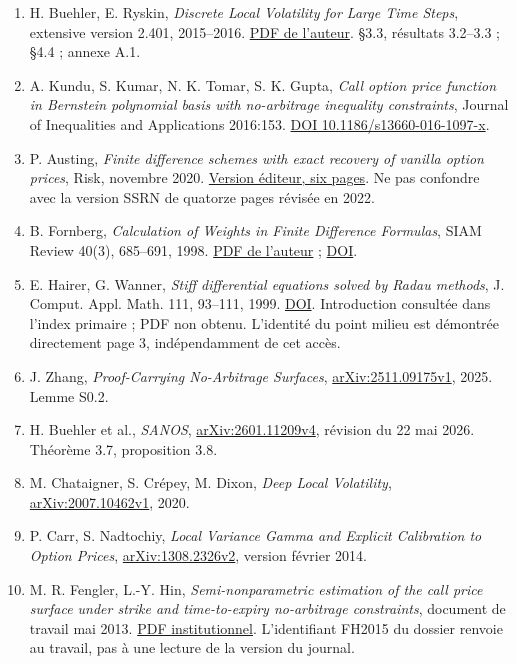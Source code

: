 \documentclass[10pt,a4paper]{article}
\begin{document}
\begin{enumerate}[leftmargin=18pt,itemsep=5pt]
\item H. Buehler, E. Ryskin, \emph{Discrete Local Volatility for Large Time Steps}, extensive version 2.401, 2015--2016. \href{https://quantitative-research.de/dl/Discrete\%20Local\%20Volatility\%20-\%20Extensive.pdf}{PDF de l'auteur}. \S3.3, résultats 3.2--3.3 ; \S4.4 ; annexe A.1.
\item A. Kundu, S. Kumar, N. K. Tomar, S. K. Gupta, \emph{Call option price function in Bernstein polynomial basis with no-arbitrage inequality constraints}, Journal of Inequalities and Applications 2016:153. \href{https://doi.org/10.1186/s13660-016-1097-x}{DOI 10.1186/s13660-016-1097-x}.
\item P. Austing, \emph{Finite difference schemes with exact recovery of vanilla option prices}, Risk, novembre 2020. \href{https://www.risk.net/media/download/1053071/download}{Version éditeur, six pages}. Ne pas confondre avec la version SSRN de quatorze pages révisée en 2022.
\item B. Fornberg, \emph{Calculation of Weights in Finite Difference Formulas}, SIAM Review 40(3), 685--691, 1998. \href{https://www.colorado.edu/amath/sites/default/files/attached-files/sirev_cl.pdf}{PDF de l'auteur} ; \href{https://doi.org/10.1137/S0036144596322507}{DOI}.
\item E. Hairer, G. Wanner, \emph{Stiff differential equations solved by Radau methods}, J. Comput. Appl. Math. 111, 93--111, 1999. \href{https://doi.org/10.1016/S0377-0427(99)00134-X}{DOI}. Introduction consultée dans l'index primaire ; PDF non obtenu. L'identité du point milieu est démontrée directement page 3, indépendamment de cet accès.
\item J. Zhang, \emph{Proof-Carrying No-Arbitrage Surfaces}, \href{https://arxiv.org/abs/2511.09175v1}{arXiv:2511.09175v1}, 2025. Lemme S0.2.
\item H. Buehler et al., \emph{SANOS}, \href{https://arxiv.org/abs/2601.11209v4}{arXiv:2601.11209v4}, révision du 22 mai 2026. Théorème 3.7, proposition 3.8.
\item M. Chataigner, S. Crépey, M. Dixon, \emph{Deep Local Volatility}, \href{https://arxiv.org/abs/2007.10462v1}{arXiv:2007.10462v1}, 2020.
\item P. Carr, S. Nadtochiy, \emph{Local Variance Gamma and Explicit Calibration to Option Prices}, \href{https://arxiv.org/abs/1308.2326v2}{arXiv:1308.2326v2}, version février 2014.
\item M. R. Fengler, L.-Y. Hin, \emph{Semi-nonparametric estimation of the call price surface under strike and time-to-expiry no-arbitrage constraints}, document de travail mai 2013. \href{https://ux-tauri.unisg.ch/RePEc/usg/econwp/EWP-1136.pdf}{PDF institutionnel}. L'identifiant FH2015 du dossier renvoie au travail, pas à une lecture de la version du journal.
\end{enumerate}
\end{document}

